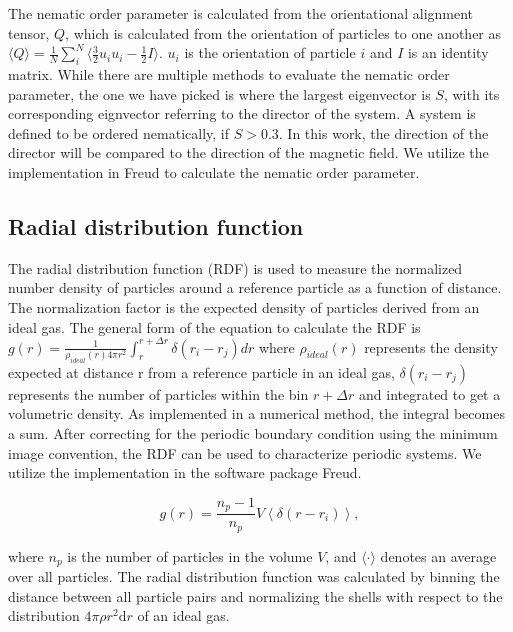 The nematic order parameter is calculated from the orientational alignment tensor, $Q$, which is calculated from the 
orientation of particles to one another as 
$\langle Q \rangle = \frac{1}{N} \sum_{i}^{N} \langle \frac{3}{2}u_i u_i - \frac{1}{2}I \rangle$. $u_i$ is the 
orientation of particle $i$ and $I$ is an identity matrix. \cite{veerman_phase_1992} While there are multiple 
methods to evaluate the nematic order parameter, the one we have picked is where the largest eigenvector is $S$, 
with its corresponding eignvector referring to the director of the system. \cite{veerman_phase_1992} 
A system is defined to be ordered nematically, 
if $S > 0.3$. In this work, the direction of the director will be compared to the direction of the magnetic 
field. We utilize the implementation in Freud to calculate the nematic order parameter.

\subsection{Radial distribution function}
\label{section:radial_distribution}

The radial distribution function (RDF) is used to measure the normalized number density of particles around a 
reference particle as a function of distance. The normalization factor is the expected density of particles derived 
from an ideal gas. The general form of the equation to calculate the RDF is 
$g(r) = \frac{1}{\rho_{ideal}(r) 4\pi r^2} \int_{r}^{r+\Delta r} \delta(r_{i} - r_{j}) dr$ where $\rho_{ideal}(r)$ 
represents the density expected at distance r from a reference particle in an ideal gas, $\delta(r_{i} - r_{j})$ 
represents the number of particles within the bin $r + \Delta r$ and integrated to get a volumetric density. 
As implemented in a numerical method, the integral becomes a sum. After correcting for the periodic boundary 
condition using the minimum image convention, the RDF can be used to characterize periodic systems. We utilize 
the implementation in the software package Freud. \cite{ramasubramani_freud_2020}

\begin{equation}
    g(r) = \frac{n_p-1}{n_p} V \left\langle\delta\left(r-r_i\right)\right\rangle ,
\end{equation}

where \(n_p\) is the number of particles in the volume
\(V\), and \(\langle\cdot\rangle\) denotes an average over all
particles. The radial distribution function was calculated by binning
the distance between all particle pairs and normalizing the shells with
respect to the distribution \(4\pi \rho r^2 \mathrm{d}r\) of an ideal
gas. 

